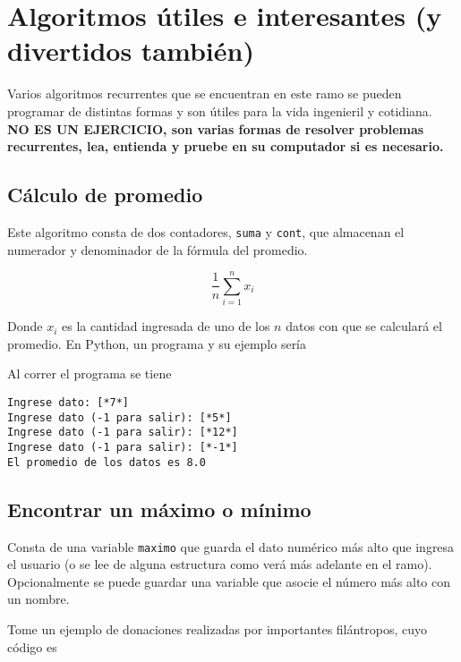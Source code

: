 \section*{Algoritmos útiles e interesantes (y divertidos también)}

Varios algoritmos recurrentes que se encuentran en este ramo se pueden programar de distintas formas y son útiles para la vida ingenieril y cotidiana. \textbf{NO ES UN EJERCICIO, son varias formas de resolver problemas recurrentes, lea, entienda y pruebe en su computador si es necesario.}

\subsection*{Cálculo de promedio}

Este algoritmo consta de dos contadores, \texttt{suma} y \texttt{cont}, que almacenan el numerador y denominador de la fórmula del promedio.

$$ \frac{1}{n}\sum_{i=1}^{n} x_{i} $$

Donde $x_i$ es la cantidad ingresada de uno de los $n$ datos con que se calculará el promedio. En Python, un programa y su ejemplo sería


    
    
Al correr el programa se tiene

\begin{lstlisting}[style=consola]
Ingrese dato: [*7*]
Ingrese dato (-1 para salir): [*5*]
Ingrese dato (-1 para salir): [*12*]
Ingrese dato (-1 para salir): [*-1*]
El promedio de los datos es 8.0
\end{lstlisting}

\subsection*{Encontrar un máximo o mínimo}

Consta de una variable \texttt{maximo} que guarda el dato numérico más alto que ingresa el usuario (o se lee de alguna estructura como verá más adelante en el ramo). Opcionalmente se puede guardar una variable que asocie el número más alto con un nombre. 

Tome un ejemplo de donaciones realizadas por importantes filántropos, cuyo código es

    

